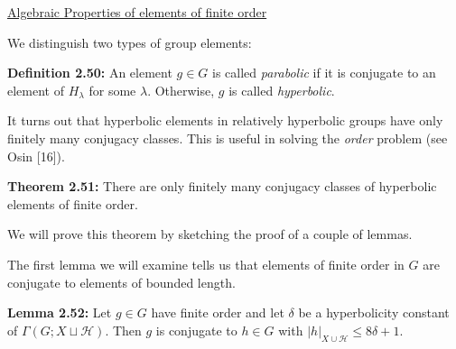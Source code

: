 \documentclass[12pt]{article}
\newcommand{\vs}{\vskip10pt}
\begin{document}
	\vs
	
	\underline{Algebraic Properties of elements of finite order}
	
	\vs 
	
	We distinguish two types of group elements: 
	
	\vs 
	
	\textbf{Definition 2.50: } An element $g \in G$ is called \textit{parabolic} if it is conjugate to an element of $H_{\lambda}$ for some $\lambda$. Otherwise, $g$ is called \textit{hyperbolic}. 
	
	\vs 
	
	It turns out that hyperbolic elements in relatively hyperbolic groups have only finitely many conjugacy classes. This is useful in solving the \textit{order} problem (see Osin [16]). 
	
	\vs 
	
	\textbf{Theorem 2.51: } There are only finitely many conjugacy classes of hyperbolic elements of finite order. 
	
	\vs 
	
	We will prove this theorem by sketching the proof of a couple of lemmas. 
	
	\vs 
	
	The first lemma we will examine tells us that elements of finite order in $G$ are conjugate to elements of bounded length. 
	
	\vs 
	
	\textbf{Lemma 2.52: } Let $g \in G$ have finite order and let $\delta$ be a hyperbolicity constant of $\Gamma(G; X \sqcup \mathcal{H})$. Then $g$ is conjugate to $h \in G$ with $\vert h \vert_{X \cup \mathcal{H}} \leq 8 \delta + 1$. 
	
\end{document}
